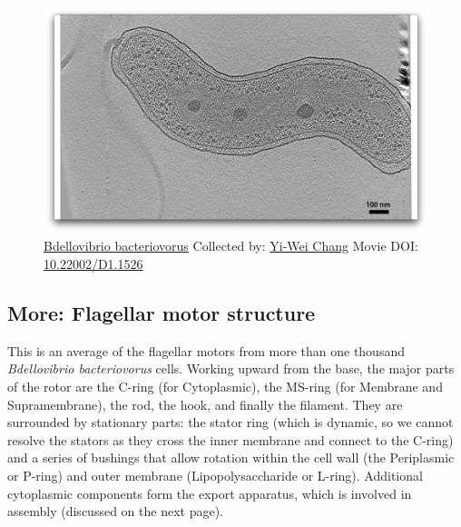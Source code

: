 \documentclass[]{tufte-book}
\begin{document}
\begin{figure}
\includegraphics{movie_stills/6_2} \caption[\protect\hyperlink{tree}{Bdellovibrio bacteriovorus} Collected
by: \protect\hyperlink{yi-wei_chang}{Yi-Wei Chang} Movie DOI:
\href{https://doi.org/10.22002/D1.1526}{10.22002/D1.1526}]{\protect\hyperlink{tree}{Bdellovibrio bacteriovorus} Collected
by: \protect\hyperlink{yi-wei_chang}{Yi-Wei Chang} Movie DOI:
\href{https://doi.org/10.22002/D1.1526}{10.22002/D1.1526}}\label{fig:6-2}
\end{figure}

\hypertarget{Flagellar_motor_structure}{\subsection*{More: Flagellar
motor structure}\label{Flagellar_motor_structure}}

This is an average of the flagellar motors from more than one thousand
\emph{Bdellovibrio bacteriovorus} cells. Working upward from the base,
the major parts of the rotor are the C-ring (for Cytoplasmic), the
MS-ring (for Membrane and Supramembrane), the rod, the hook, and finally
the filament. They are surrounded by stationary parts: the stator ring
(which is dynamic, so we cannot resolve the stators as they cross the
inner membrane and connect to the C-ring) and a series of bushings that
allow rotation within the cell wall (the Periplasmic or P-ring) and
outer membrane (Lipopolysaccharide or L-ring). Additional cytoplasmic
components form the export apparatus, which is involved in assembly
(discussed on the next page).
\end{document}
